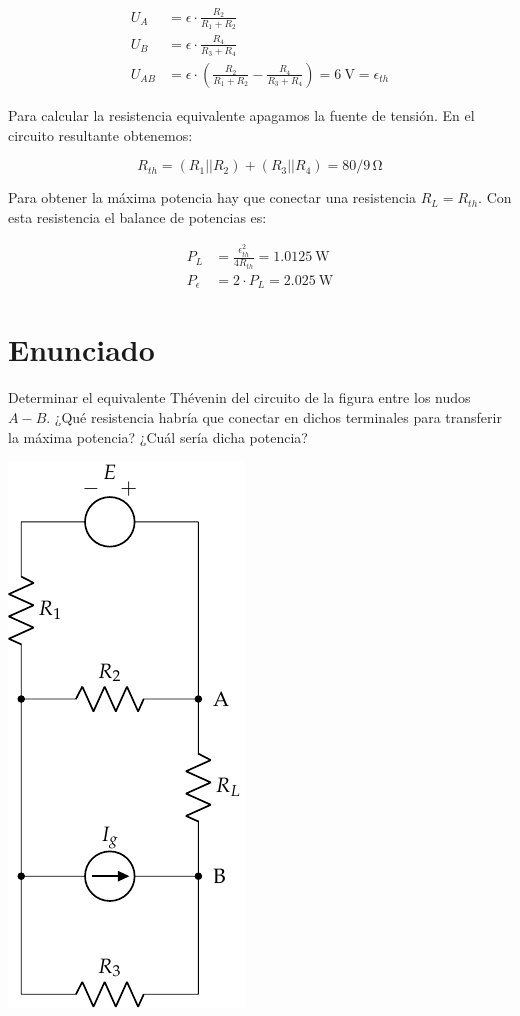 \begin{align*}
  U_A &= \epsilon \cdot \frac{R_2}{R_1 + R_2}\\
  U_B &= \epsilon \cdot \frac{R_4}{R_3 + R_4}\\
  U_{AB} &= \epsilon \cdot (\frac{R_2}{R_1 + R_2} -  \frac{R_4}{R_3 + R_4}) = \qty{6}{\volt} = \epsilon_{th}
\end{align*}

Para calcular la resistencia equivalente apagamos la fuente de
tensión. En el circuito resultante obtenemos:

\begin{equation*}
  R_{th} = (R_1 || R_2) + (R_3 || R_4) = 80/9 \, \si{\ohm}
\end{equation*}

Para obtener la máxima potencia hay que conectar una resistencia
$R_L = R_{th}$. Con esta resistencia el balance de potencias es:

\begin{align*}
  P_L &= \frac{\epsilon_{th}^2}{4R_{th}} = \qty{1.0125}{\watt}\\
  P_\epsilon &= 2 \cdot P_L = \qty{2.025}{\watt}
\end{align*}


\section{Enunciado}
Determinar el equivalente Thévenin del circuito de la figura entre los
nudos $A-B$. ¿Qué resistencia habría que conectar en dichos terminales
para transferir la máxima potencia? ¿Cuál sería dicha potencia?

\begin{center}
  \includegraphics{figuras/BT1_17.pdf}
\end{center}

